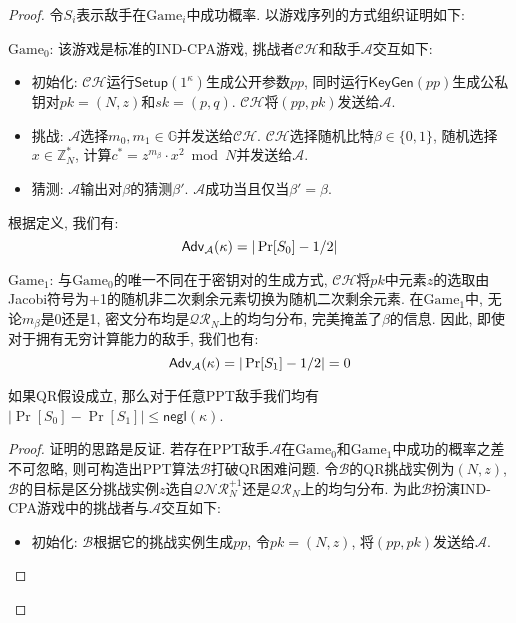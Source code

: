 \begin{proof}
令$S_i$表示敌手在$\text{Game}_i$中成功概率. 以游戏序列的方式组织证明如下: 

\begin{trivlist}
\item $\text{Game}_0$: 该游戏是标准的IND-CPA游戏, 挑战者$\mathcal{CH}$和敌手$\mathcal{A}$交互如下: 
\begin{itemize}
	\item 初始化: $\mathcal{CH}$运行$\mathsf{Setup}(1^\kappa)$生成公开参数$pp$, 
		同时运行$\mathsf{KeyGen}(pp)$生成公私钥对$pk = (N, z)$和$sk = (p, q)$. 
		$\mathcal{CH}$将$(pp, pk)$发送给$\mathcal{A}$. 

	\item 挑战: $\mathcal{A}$选择$m_0, m_1 \in \mathbb{G}$并发送给$\mathcal{CH}$. 
		$\mathcal{CH}$选择随机比特$\beta \in \{0,1\}$, 随机选择$x \in \mathbb{Z}_N^*$, 
		计算$c^* = z^{m_\beta} \cdot x^2 \bmod N$并发送给$\mathcal{A}$.  

	\item 猜测: $\mathcal{A}$输出对$\beta$的猜测$\beta'$. $\mathcal{A}$成功当且仅当$\beta' = \beta$. 
\end{itemize} 
根据定义, 我们有: 
\begin{equation*}
	\mathsf{Adv}_\mathcal{A}(\kappa) = |\Pr[S_0] - 1/2|
\end{equation*}

\item $\text{Game}_1$: 与$\text{Game}_0$的唯一不同在于密钥对的生成方式, 
	$\mathcal{CH}$将$pk$中元素$z$的选取由Jacobi符号为+1的随机非二次剩余元素切换为随机二次剩余元素. 
	在$\text{Game}_1$中, 无论$m_\beta$是0还是1, 密文分布均是$\mathcal{QR}_N$上的均匀分布, 完美掩盖了$\beta$的信息. 
	因此, 即使对于拥有无穷计算能力的敌手, 我们也有:   
\begin{equation*}
	\mathsf{Adv}_\mathcal{A}(\kappa) = |\Pr[S_1] - 1/2| = 0
\end{equation*}
\end{trivlist}

\begin{lemma}
如果QR假设成立, 那么对于任意PPT敌手我们均有$|\Pr[S_0]-\Pr[S_1]| \leq \mathsf{negl}(\kappa)$. 
\end{lemma}

\begin{proof}
证明的思路是反证. 若存在PPT敌手$\mathcal{A}$在$\text{Game}_0$和$\text{Game}_1$中成功的概率之差不可忽略, 
则可构造出PPT算法$\mathcal{B}$打破QR困难问题. 
令$\mathcal{B}$的QR挑战实例为$(N, z)$, $\mathcal{B}$的目标是区分挑战实例$z$选自$\mathcal{QNR}_N^{+1}$还是$\mathcal{QR}_N$上的均匀分布.  
为此$\mathcal{B}$扮演IND-CPA游戏中的挑战者与$\mathcal{A}$交互如下: 
\begin{itemize}
	\item 初始化: $\mathcal{B}$根据它的挑战实例生成$pp$, 令$pk = (N, z)$, 将$(pp, pk)$发送给$\mathcal{A}$.   


\end{itemize}
\end{proof}
\end{proof}
